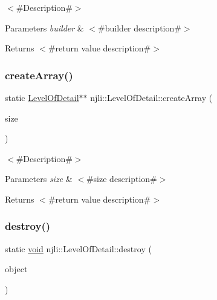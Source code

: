 $<$\#\+Description\#$>$


\begin{DoxyParams}{Parameters}
{\em builder} & $<$\#builder description\#$>$\\
\hline
\end{DoxyParams}
\begin{DoxyReturn}{Returns}
$<$\#return value description\#$>$ 
\end{DoxyReturn}
\mbox{\label{classnjli_1_1_level_of_detail_ab8a51c06db961b97b3934fb3a0a5a6c4}} 
\subsubsection{\texorpdfstring{create\+Array()}{createArray()}}
{\footnotesize\ttfamily static \mbox{\hyperlink{classnjli_1_1_level_of_detail}{Level\+Of\+Detail}}$\ast$$\ast$ njli\+::\+Level\+Of\+Detail\+::create\+Array (\begin{DoxyParamCaption}\item[{const \mbox{\hyperlink{_util_8h_a10e94b422ef0c20dcdec20d31a1f5049}{u32}}}]{size }\end{DoxyParamCaption})\hspace{0.3cm}{\ttfamily [static]}}

$<$\#\+Description\#$>$


\begin{DoxyParams}{Parameters}
{\em size} & $<$\#size description\#$>$\\
\hline
\end{DoxyParams}
\begin{DoxyReturn}{Returns}
$<$\#return value description\#$>$ 
\end{DoxyReturn}
\mbox{\label{classnjli_1_1_level_of_detail_a532c61a6453bc75fff3d1d813a9a904c}} 
\subsubsection{\texorpdfstring{destroy()}{destroy()}}
{\footnotesize\ttfamily static \mbox{\hyperlink{_thread_8h_af1e856da2e658414cb2456cb6f7ebc66}{void}} njli\+::\+Level\+Of\+Detail\+::destroy (\begin{DoxyParamCaption}\item[{\mbox{\hyperlink{classnjli_1_1_level_of_detail}{Level\+Of\+Detail}} $\ast$}]{object }\end{DoxyParamCaption})\hspace{0.3cm}{\ttfamily [static]}}

